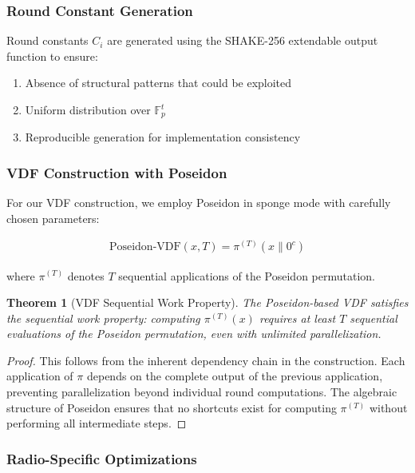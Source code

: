 \documentclass[11pt,a4paper]{article}
\newtheorem{theorem}{Theorem}[section]
\begin{document}
\subsubsection{Round Constant Generation}

Round constants $C_i$ are generated using the SHAKE-256 extendable output function to ensure:
\begin{enumerate}
\item Absence of structural patterns that could be exploited
\item Uniform distribution over $\mathbb{F}_p^t$
\item Reproducible generation for implementation consistency
\end{enumerate}

\subsubsection{VDF Construction with Poseidon}

For our VDF construction, we employ Poseidon in sponge mode with carefully chosen parameters:

\begin{align}
\text{Poseidon-VDF}(x, T) = \pi^{(T)}(x \| 0^c)
\end{align}

where $\pi^{(T)}$ denotes $T$ sequential applications of the Poseidon permutation.

\begin{theorem}[VDF Sequential Work Property]
The Poseidon-based VDF satisfies the sequential work property: computing $\pi^{(T)}(x)$ requires at least $T$ sequential evaluations of the Poseidon permutation, even with unlimited parallelization.
\end{theorem}

\begin{proof}
This follows from the inherent dependency chain in the construction. Each application of $\pi$ depends on the complete output of the previous application, preventing parallelization beyond individual round computations. The algebraic structure of Poseidon ensures that no shortcuts exist for computing $\pi^{(T)}$ without performing all intermediate steps.
\end{proof}

\subsubsection{Radio-Specific Optimizations}
\end{document}
